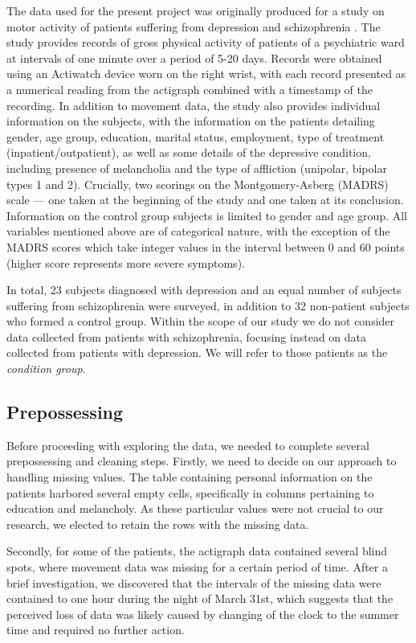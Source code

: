 \documentclass[12pt]{article}
\begin{document}
The data used for the present project was originally produced for a study on motor activity of patients suffering from depression and schizophrenia \parencite{Berle_2010}. The study provides records of gross physical activity of patients of a psychiatric ward at intervals of one minute over a period of 5-20 days. Records were obtained using an Actiwatch device worn on the right wrist, with each record presented as a numerical reading from the actigraph combined with a timestamp of the recording. In addition to movement data, the study also provides individual information on the subjects, with the information on the patients detailing gender, age group, education, marital status, employment, type of treatment (inpatient/outpatient), as well as some details of the depressive condition, including presence of melancholia and the type of affliction (unipolar, bipolar types 1 and 2). Crucially, two scorings on the Montgomery-Asberg (MADRS) scale \parencite{Montgomery_Asberg_1979} — one taken at the beginning of the study and one taken at its conclusion. Information on the control group subjects is limited to gender and age group. All variables mentioned above are of categorical nature, with the exception of the MADRS scores which take integer values in the interval between 0 and 60 points (higher score represents more severe symptoms).

In total, 23 subjects diagnosed with depression and an equal number of subjects suffering from schizophrenia were surveyed, in addition to 32 non-patient subjects who formed a control group. Within the scope of our study we do not consider data collected from patients with schizophrenia, focusing instead on data collected from patients with depression. We will refer to those patients as the \textit{condition group}.

\subsection{Prepossessing}

Before proceeding with exploring the data, we needed to complete several prepossessing and cleaning steps. Firstly, we need to decide on our approach to handling missing values. The table containing personal information on the patients harbored several empty cells, specifically in columns pertaining to education and melancholy. As these particular values were not crucial to our research, we elected to retain the rows with the missing data.

Secondly, for some of the patients, the actigraph data contained several blind spots, where movement data was missing for a certain period of time. After a brief investigation, we discovered that the intervals of the missing data were contained to one hour during the night of March 31st, which suggests that the perceived loss of data was likely caused by changing of the clock to the summer time and required no further action.
\end{document}

